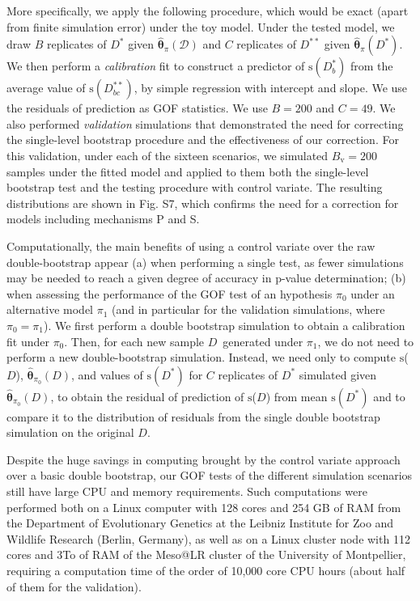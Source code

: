 \documentclass[a4paper]{article}\usepackage[]{graphicx}\usepackage[]{color}
\newcommand{\adata}{\ensuremath{\mathcal{D}}}
\newcommand{\data}{\ensuremath{D}}
\newcommand{\datab}{\ensuremath{D_{b}^*}}
\newcommand{\databb}{\ensuremath{D_{bc}^{**}}}
\newcommand{\sfn}{\ensuremath{\mathrm{s}}}
\newcommand{\bth}{\ensuremath{\boldsymbol{\theta}}}
\begin{document}
More specifically, we apply the following procedure, which would be exact (apart from finite simulation error) under the toy model. Under the tested model, we draw $B$ replicates of $\data^*$ given $\hat{\bth}_\pi(\adata)$ and $C$ replicates of $\data^{**}$ given $\hat{\bth}_\pi(\data^*)$. We then perform a \emph{calibration} fit to construct a predictor of $\sfn(\datab)$ from the average value of $\sfn(\databb)$, by simple regression with intercept and slope. We use the residuals of prediction as GOF statistics. We use $B=200$ and $C=49$. We also performed \emph{validation} simulations that demonstrated the need for correcting the single-level bootstrap procedure and the effectiveness of our correction. For this validation, under each of the sixteen scenarios, we simulated $B_{\mathrm{v}}=200$ samples under the fitted model and applied to them both the single-level bootstrap test and the testing procedure with control variate. The resulting distributions are shown in Fig. S7, which confirms the need for a correction for models including mechanisms P and S.

Computationally, the main benefits of using a control variate over the raw double-bootstrap appear (a) when performing a single test, as fewer simulations may be needed to reach a given degree of accuracy in p-value determination; (b) when assessing the performance of the GOF test of an hypothesis $\pi_0$ under an alternative model $\pi_1$ (and in particular for the validation simulations, where $\pi_0 = \pi_1$). We first perform a double bootstrap simulation to obtain a calibration fit under $\pi_0$. Then, for each new sample \data\ generated under $\pi_1$, we do not need to perform a new double-bootstrap simulation. Instead, we need only to compute \sfn(\data), $\hat{\bth}_{\pi_0}(\data)$, and values of $\sfn(\data^*)$ for $C$ replicates of $\data^*$ simulated given $\hat{\bth}_{\pi_0}(\data)$, to obtain the residual of prediction of \sfn(\data)  from mean $\sfn(\data^*)$ and to compare it to the distribution of residuals from the single double bootstrap simulation on the original \data.

Despite the huge savings in computing brought by the control variate approach over a basic double bootstrap, our GOF tests of the different simulation scenarios still have large CPU and memory requirements. Such computations were performed both on a Linux computer with 128 cores and 254 GB of RAM from the Department of Evolutionary Genetics at the Leibniz Institute for Zoo and Wildlife Research (Berlin, Germany), as well as on a Linux cluster node with 112 cores and 3To of RAM of the Meso@LR cluster of the University of Montpellier, requiring a computation time of the order of 10,000 core CPU hours (about half of them for the validation).
\end{document}
